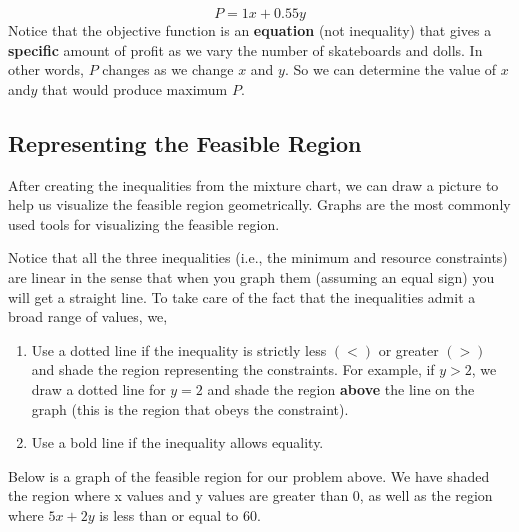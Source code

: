 \documentclass[
  letterpaper,
  DIV=11,
  numbers=noendperiod]{scrreprt}
\providecommand{\tightlist}{%
  \setlength{\itemsep}{0pt}\setlength{\parskip}{0pt}}\usepackage{longtable,booktabs,array}
\begin{document}
\[P=1x+0.55y\] Notice that the objective function is an
\textbf{equation} (not inequality) that gives a \textbf{specific} amount
of profit as we vary the number of skateboards and dolls. In other
words, \(P\) changes as we change \(x\) and \(y\). So we can determine
the value of \(x\) and\(y\) that would produce maximum \(P\).

\hypertarget{representing-the-feasible-region}{%
\subsection{Representing the Feasible
Region}\label{representing-the-feasible-region}}

After creating the inequalities from the mixture chart, we can draw a
picture to help us visualize the feasible region geometrically. Graphs
are the most commonly used tools for visualizing the feasible region.

Notice that all the three inequalities (i.e., the minimum and resource
constraints) are linear in the sense that when you graph them (assuming
an equal sign) you will get a straight line. To take care of the fact
that the inequalities admit a broad range of values, we,

\begin{enumerate}
\def\labelenumi{\alph{enumi})}
\tightlist
\item
  Use a dotted line if the inequality is strictly less \((<)\) or
  greater \((>)\) and shade the region representing the constraints. For
  example, if \(y>2\), we draw a dotted line for \(y=2\) and shade the
  region \textbf{above} the line on the graph (this is the region that
  obeys the constraint).
\item
  Use a bold line if the inequality allows equality.
\end{enumerate}

Below is a graph of the feasible region for our problem above. We have
shaded the region where x values and y values are greater than 0, as
well as the region where \(5x+2y\) is less than or equal to 60.
\end{document}
